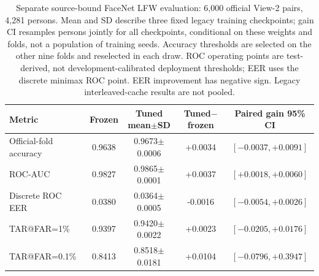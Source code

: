 \begin{table}[!t]
\caption{Separate source-bound FaceNet LFW evaluation: 6{,}000 official View-2 pairs, 4{,}281 persons. Mean and SD describe three fixed legacy training checkpoints; gain CI resamples persons jointly for all checkpoints, conditional on these weights and folds, not a population of training seeds. Accuracy thresholds are selected on the other nine folds and reselected in each draw. ROC operating points are test-derived, not development-calibrated deployment thresholds; EER uses the discrete minimax ROC point. EER improvement has negative sign. Legacy interleaved-cache results are not pooled.}
\label{tab:lfw-bound}
\centering\footnotesize
\begin{tabular}{@{}lcccc@{}}
\toprule
Metric & Frozen & Tuned mean$\pm$SD & Tuned$-$frozen & Paired gain 95\% CI \\
\midrule
Official-fold accuracy & 0.9638 & 0.9673$\pm$0.0006 & +0.0034 & $[-0.0037,+0.0091]$ \\
ROC-AUC & 0.9827 & 0.9865$\pm$0.0001 & +0.0037 & $[+0.0018,+0.0060]$ \\
Discrete ROC EER & 0.0380 & 0.0364$\pm$0.0005 & -0.0016 & $[-0.0054,+0.0026]$ \\
TAR@FAR=1\% & 0.9397 & 0.9420$\pm$0.0022 & +0.0023 & $[-0.0205,+0.0176]$ \\
TAR@FAR=0.1\% & 0.8413 & 0.8518$\pm$0.0181 & +0.0104 & $[-0.0796,+0.3947]$ \\
\bottomrule
\end{tabular}
\end{table}
